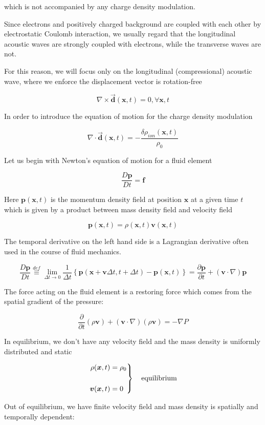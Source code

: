 which is not accompanied by any charge density modulation.

Since electrons and positively charged background are coupled with each other by electrostatic Coulomb interaction, we usually regard that the longitudinal acoustic waves are strongly coupled with electrons, while the transverse waves are not.

For this reason, we will focus only on the longitudinal (compressional) acoustic wave, where we enforce the displacement vector is rotation-free

\[\nabla\times\vec{\bm{d}}(\bm{x},t) = 0,\forall\bm{x},t \]

In order to introduce the equation of motion for the charge density modulation

\[\nabla\cdot\vec{\bm{d}}(\bm{x},t) = -\frac{\delta\rho_{ion}(\bm{x},t)}{\rho_0} \]

Let us begin with Newton's equation of motion for a fluid element

\[\frac{D\bm{p}}{Dt} = \bm{f} \]

Here $\bm{p}(\bm{x},t)$ is the momentum density field at position $\bm{x}$ at a given time $t$ which is given by a product between mass density field and velocity field

\[\bm{p}(\bm{x},t) = \rho(\bm{x},t)\bm{v}(\bm{x},t) \]

The temporal derivative on the left hand side is a Lagrangian derivative often used in the course of fluid mechanics.

\[\frac{D\bm{p}}{Dt} \overset{def}{\equiv}\lim_{\Delta t\rightarrow0}\frac{1}{\Delta t} \left\{\bm{p}(\bm{x}+\bm{v}\Delta t,t+\Delta t) - \bm{p}(\bm{x},t)\right\} = \frac{\partial\bm{p}}{\partial t}+(\bm{v}\cdot\nabla)\bm{p} \]

The force acting on the fluid element is a restoring force which comes from the spatial gradient of the pressure:

\[\frac{\partial}{\partial t}(\rho\bm{v})+(\bm{v}\cdot\nabla)(\rho\bm{v}) = -\nabla P \]

In equilibrium, we don't have any velocity field and the mass density is uniformly distributed and static

\[\left.\begin{aligned}
\rho(\bm{x},t) &= \rho_0\\
\ & \ \\
\bm{v}(\bm{x},t) &= 0
\end{aligned}\right\}\text{\quad equilibrium} \]

Out of equilibrium, we have finite velocity field and mass density is spatially and temporally dependent:

